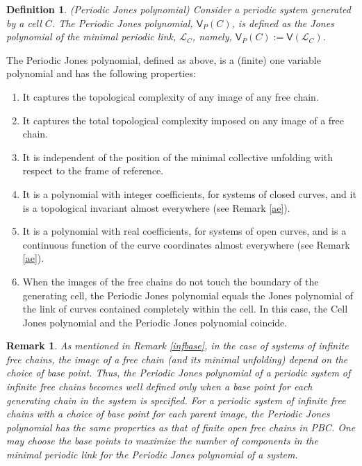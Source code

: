\documentclass{article}
\newtheorem{definition}{Definition}[section]
\newtheorem{remark}{Remark}[section]
\begin{document}
\begin{definition}(Periodic Jones polynomial) Consider a periodic system generated by a cell $C$. The Periodic Jones polynomial, $\mathsf{V}_P(C)$, is defined as the Jones polynomial of the minimal periodic link, $\mathcal{L}_C$, namely, $\displaystyle  \mathsf{V}_P(C) := \mathsf{V}(\mathcal{L}_C).$
\label{PJPinf}
\end{definition}
\noindent The Periodic Jones polynomial, defined as above, is a (finite) one variable polynomial and has the following properties:
\begin{enumerate}
\item It captures the topological complexity of any image of any free chain.
    \item It captures the total topological complexity imposed on any image of a free chain. 
    \item It is independent of the position of the minimal collective unfolding with respect to the frame of reference.
    \item It is a polynomial with integer coefficients, for systems of closed curves, and it is a topological invariant  almost everywhere (see Remark \ref{ae}).
    \item It is a polynomial with real coefficients, for systems of open curves, and is a continuous function of the curve coordinates almost everywhere (see Remark \ref{ae}).
    \item When the images of the free chains do not touch the boundary of the generating cell, the Periodic Jones polynomial equals the Jones polynomial of the link of curves contained completely within the cell. In this case, the Cell Jones polynomial and the Periodic Jones polynomial coincide.
\end{enumerate}


\begin{remark}
\label{inf_chains}
As mentioned in Remark \ref{infbase}, in the case of systems of infinite free chains, the image of a free chain (and its minimal unfolding) depend on the choice of base point. Thus, the Periodic Jones polynomial of a periodic system of infinite free chains becomes well defined only when a base point for each generating chain in the system is specified. For a periodic system of infinite free chains with a choice of base point for each parent image, the Periodic Jones polynomial has the same properties as that of finite open free chains in PBC. One may choose the base points to maximize the number of components in the minimal periodic link for the Periodic Jones polynomial of a system.
\end{remark}
\end{document}
